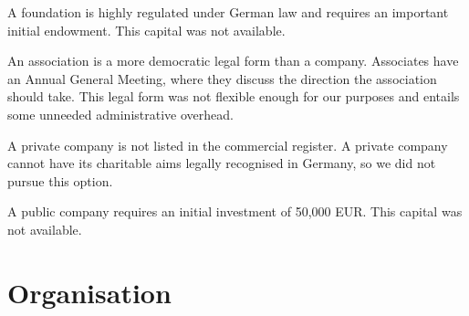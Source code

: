 \documentclass[output=guidelines,nonflat,
draftmode
]{langsci/langscibook}
\newcommand{\othersolutions}[1]{
  \renewcommand{\tblslinecolour}{lsDarkGreenOne}
  \tblssy{more}{Other solutions}{#1}
}
\renewcommand{\tblssy}[4][black!12]{%
  \renewcommand{\langscisymbol}{#2}\renewcommand{\tblsboxcolor}{#1}
  \begin{mdframed}[style=yellowexercise,frametitle={#3}]
    #4
  \end{mdframed}
}
\begin{document}
\othersolutions{
A foundation is highly regulated under German law and requires an important initial endowment. This capital was not available. 

An association is a more democratic legal form than a company. Associates have an Annual General Meeting, where they discuss the direction the association should take. This legal form was not flexible enough for our purposes and entails some unneeded administrative overhead. 

A private company is not listed in the  commercial register. A private company cannot have its charitable aims legally recognised in Germany, so we did not pursue this option. 

A public company requires an initial investment of 50,000 EUR. This capital was not available. 
}
 

\section{Organisation}
\end{document}
